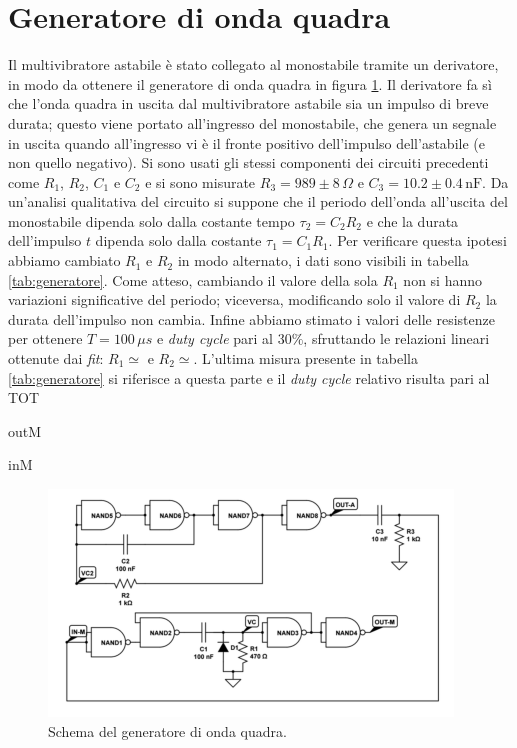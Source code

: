 \documentclass[10pt,a4paper]{article}
\begin{document}
\section{Generatore di onda quadra}
Il multivibratore astabile è stato collegato al monostabile tramite un derivatore, in modo da ottenere il generatore di onda quadra in figura \ref{fig:generatorequadra}. Il derivatore fa sì che l'onda quadra in uscita dal multivibratore astabile sia un impulso di breve durata; questo viene portato all'ingresso del monostabile, che genera un segnale in uscita quando all'ingresso vi è il fronte positivo dell'impulso dell'astabile (e non quello negativo). Si sono usati gli stessi componenti dei circuiti precedenti come $R_1$, $R_2$, $C_1$ e $C_2$ e si sono misurate $R_3=989\pm8\,\Omega$ e $C_3= 10.2\pm0.4 \,\text{nF}$. Da un'analisi qualitativa del circuito si suppone che il periodo dell'onda all'uscita del monostabile dipenda solo dalla costante tempo $\tau_2=C_2R_2$ e che la durata dell'impulso $t$ dipenda solo dalla costante $\tau_1=C_1R_1$. Per verificare questa ipotesi abbiamo cambiato $R_1$ e $R_2$ in modo alternato, i dati sono visibili in tabella \ref{tab:generatore}. Come atteso, cambiando il valore della sola $R_1$ non si hanno variazioni significative del periodo; viceversa, modificando solo il valore di $R_2$ la durata dell'impulso non cambia.
Infine abbiamo stimato i valori delle resistenze per ottenere $T=100\,\mu s$ e \emph{duty cycle} pari al $30\%$, sfruttando le relazioni lineari ottenute dai \emph{fit}: $R_1\simeq $ e $R_2 \simeq $. L'ultima misura presente in tabella \ref{tab:generatore} si riferisce a questa parte e il \emph{duty cycle} relativo risulta pari al TOT



outM

inM





\begin{figure}[!htb]
  \centering
  \includegraphics[scale=0.5]{generatorequadra.png}
\caption{Schema del generatore di onda quadra.\label{fig:generatorequadra}}
\end{figure}
\end{document}
